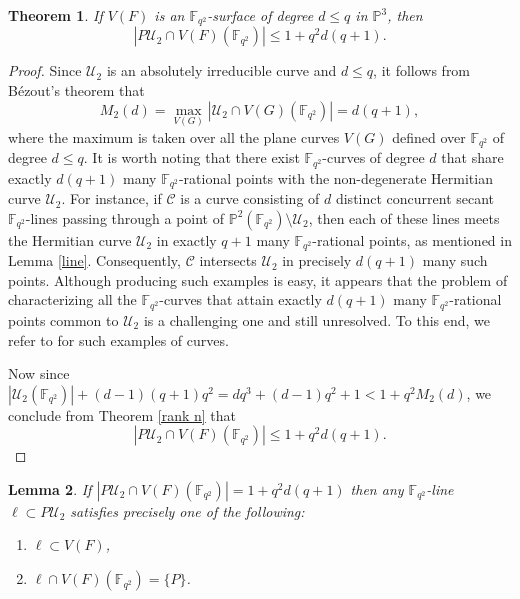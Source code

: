 \documentclass[10pt,a4paper,oneside]{amsproc}
\newtheorem{theorem}{Theorem}[section]
\newtheorem{lemma}[theorem]{Lemma}
\newcommand{\Fqt}{\mathbb{F}_{q^2}}
\newcommand{\C}{\mathcal{C}}
\newcommand{\U}{\mathcal{U}}
\def\PP{{\mathbb P}}
\begin{document}
\begin{theorem}
\label{surface and rank n}
If $V(F)$ is an $\Fqt$-surface of degree $d\leq q$ in $\PP^3$, then $$|P\U_2\cap V(F)(\Fqt)|\leq 1+q^2d(q+1).$$   
\end{theorem}
\begin{proof}
 Since $\U_2$ is an absolutely irreducible curve and $d\leq q$, it follows from B\'{e}zout's theorem that $$M_2(d)=\max_{V(G)}|\U_2\cap V(G)(\Fqt)|=d(q+1),$$ where the maximum is taken over all the plane curves $V(G)$ defined over $\Fqt$ of degree $d\leq q$. It is worth noting that there exist $\Fqt$-curves of degree $d$ that share exactly $d(q+1)$ many $\Fqt$-rational points with the non-degenerate Hermitian curve $\U_2$. For instance, if $\C$ is a curve consisting of $d$  distinct concurrent secant $\Fqt$-lines passing through a point of $\PP^2(\Fqt) \setminus \U_2$, then each of these lines meets the Hermitian curve $\U_2$ in exactly $q+1$ many $\Fqt$-rational points, as mentioned in Lemma \ref{line}. Consequently, $\C$ intersects $\U_2$ in precisely $d(q+1)$ many such points. Although producing such examples is easy, it appears that the problem of characterizing all the $\Fqt$-curves that attain exactly $d(q+1)$ many $\Fqt$-rational points common to $\U_2$ is a challenging one and still unresolved. To this end, we refer to \cite{BDMN} for such examples of curves. 
 
 Now since $|\U_2(\Fqt)|+(d-1)(q+1)q^2=dq^3+(d-1)q^2+1<1+q^2M_2(d)$, we conclude from Theorem \ref{rank n} that $$|P\U_2\cap V(F)(\Fqt)|\leq 1+q^2d(q+1).$$ 
\end{proof}
\begin{lemma}\label{line confi} If $|P\U_2\cap V(F)(\Fqt)|=1+q^2d(q+1)$ then any $\Fqt$-line $\ell\subset P\U_2$ satisfies precisely one of the following:
   \begin{enumerate}
       \item[(a)] $\ell\subset V(F)$,
       \item [(b)] $\ell\cap V(F)(\Fqt)=\{P\}$.
   \end{enumerate}
\end{lemma}
\end{document}
